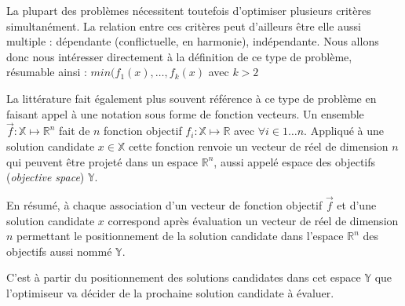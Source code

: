\sloppy La plupart des problèmes nécessitent toutefois d'optimiser plusieurs critères simultanément. La relation entre ces critères peut d'ailleurs être elle aussi multiple : dépendante (conflictuelle, en harmonie), indépendante. Nous allons donc nous intéresser directement à la définition de ce type de problème, résumable ainsi :  $min(f_1(x), \dotsc, f_k(x)$ avec $k > 2$

La littérature fait également plus souvent référence à ce type de problème en faisant appel à une notation sous forme de fonction vecteurs. Un ensemble $\vec{f} : \mathbb{X} \mapsto \mathbb{R}^n$ fait de $n$ fonction objectif $f_i : \mathbb{X} \mapsto \mathbb{R}$ avec $\forall i \in 1 \dotsc n$. Appliqué à une solution candidate $x \in \mathbb{X}$ cette fonction renvoie un vecteur de réel de dimension $n$ qui peuvent être projeté dans un espace $\mathbb{R}^n$, aussi appelé espace des objectifs (\textit{objective space}) $\mathbb{Y}$.

En résumé, à chaque association d'un vecteur de fonction objectif $\vec{f}$ et d'une solution candidate $x$ correspond après évaluation un vecteur de réel de dimension $n$ permettant le positionnement de la solution candidate dans l'espace $\mathbb{R}^n$ des objectifs aussi nommé $\mathbb{Y}$.

C'est à partir du positionnement des solutions candidates dans cet espace $\mathbb{Y}$ que l'optimiseur va décider de la prochaine solution candidate à évaluer.


